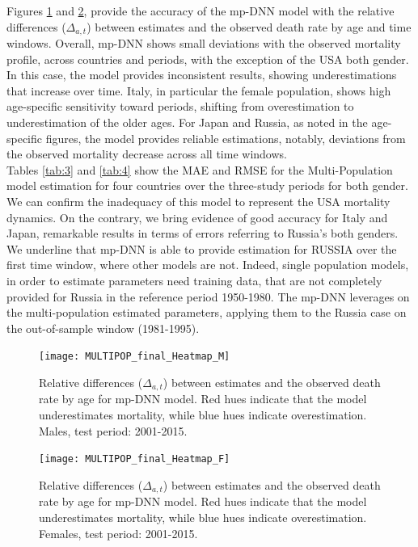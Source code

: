 \documentclass[a4,11pt]{article}
\begin{document}
Figures \ref{fig:MP.relative.diff.MALE} and \ref{fig:MP.relative.diff.FEMALE}, provide the accuracy of the mp-DNN model with the relative differences ($\Delta_{a,t}$) between estimates and the observed death rate by age and time windows.
Overall, mp-DNN shows small deviations with the observed mortality profile, across countries and periods, with the exception of the USA both gender. In this case, the model provides inconsistent results, showing underestimations that increase over time.
Italy, in particular the female population, shows high age-specific sensitivity toward periods, shifting from overestimation to underestimation of the older ages.
For Japan and Russia, as noted in the age-specific figures, the model provides reliable estimations, notably, deviations from the observed mortality decrease across all time windows.\\

Tables \ref{tab:3} and \ref{tab:4} show the MAE and RMSE for the Multi-Population model estimation for four countries over the three-study periods for both gender. 
We can confirm the inadequacy of this model to represent the USA mortality dynamics. On the contrary, we bring evidence of good accuracy for Italy and Japan, remarkable results in terms of errors referring to Russia's both genders.
We underline that mp-DNN is able to provide estimation for RUSSIA over the first time window, where other models are not. Indeed, 
single population models, in order to estimate parameters need training data, that are not completely provided for Russia in the reference period 1950-1980. The mp-DNN leverages on the multi-population estimated parameters, applying them to the Russia case on the out-of-sample window (1981-1995).\\

\begin{figure}[H]
	\centering
	\texttt{[image: MULTIPOP\_final\_Heatmap\_M]}\\
	 \caption{Relative differences ($\Delta_{a,t}$) between estimates and the observed death rate by age for mp-DNN model. Red hues indicate that the model underestimates mortality, while blue hues indicate overestimation. Males, test period: 2001-2015.}
	 \label{fig:MP.relative.diff.MALE}
\end{figure}

\begin{figure}[H]
	\centering
	\texttt{[image: MULTIPOP\_final\_Heatmap\_F]}\\
	 \caption{Relative differences ($\Delta_{a,t}$) between estimates and the observed death rate by age for mp-DNN model. Red hues indicate that the model underestimates mortality, while blue hues indicate overestimation. Females, test period: 2001-2015.}
	 \label{fig:MP.relative.diff.FEMALE}
\end{figure}
\end{document}
